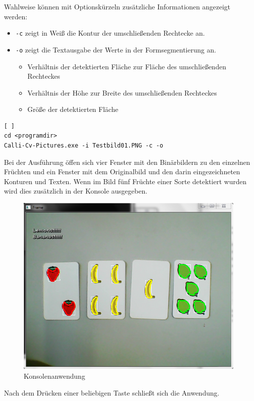 Wahlweise können mit Optionskürzeln zusätzliche Informationen angezeigt werden:
\begin{itemize}
\item \lstinline{-c} zeigt in Weiß die Kontur der umschließenden Rechtecke an. 
\item \lstinline{-o} zeigt die Textausgabe der Werte in der Formsegmentierung an.
\begin{itemize}
\item Verhältnis der detektierten Fläche zur Fläche des umschließenden Rechteckes
\item Verhältnis der Höhe zur Breite des umschließenden Rechteckes
\item Größe der detektierten Fläche
\end{itemize}
\end{itemize}

\begin{singlespace}
\begin{lstlisting}[ ]
cd <programdir>
Calli-Cv-Pictures.exe -i Testbild01.PNG -c -o
\end{lstlisting}
\end{singlespace}
Bei der Ausführung öffen sich vier Fenster mit den Binärbildern zu den einzelnen Früchten und ein Fenster mit dem Originalbild und den darin eingezeichneten Konturen und Texten. Wenn im Bild fünf Früchte einer Sorte detektiert wurden wird dies zusätzlich in der Konsole ausgegeben.

\begin{figure}[H]
    \centering
    \includegraphics[width=15cm]{Abbildungen/Calli-Konsole}
    \caption[Konsole]{Konsolenanwendung}
    \label{fig:Konsole}
\end{figure}

Nach dem Drücken einer beliebigen Taste schließt sich die Anwendung.